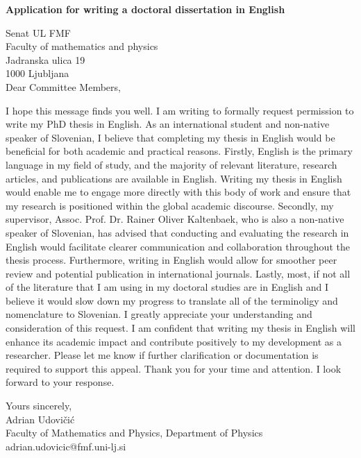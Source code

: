 \documentclass{article}
\theoremstyle{mytheoremstyle}
\theoremstyle{mytheoremstyle}
\theoremstyle{myproblemstyle}
\begin{document}
\clearpage
\pagestyle{plain}

\begin{center}
    \textbf{Application for writing a doctoral dissertation in English}\\
\end{center}

\noindent Senat UL FMF\\
    Faculty of mathematics and physics\\
    Jadranska ulica 19\\
    1000 Ljubljana\\

\vspace{1cm} %
Dear Committee Members,
\vspace{1cm}

I hope this message finds you well. I am writing to formally request permission to write my PhD thesis in English.
As an international student and non-native speaker of Slovenian, I believe that completing my thesis in English would be beneficial for both academic and practical reasons.
Firstly, English is the primary language in my field of study, and the majority of relevant literature, research articles, and publications are available in English.
Writing my thesis in English would enable me to engage more directly with this body of work and ensure that my research is positioned within the global academic discourse.
Secondly, my supervisor, Assoc. Prof. Dr. Rainer Oliver Kaltenbaek, who is also a non-native speaker of Slovenian, has advised that conducting and evaluating the research in
English would facilitate clearer communication and collaboration throughout the thesis process. Furthermore, writing in English would allow for smoother peer review
and potential publication in international journals.
Lastly, most, if not all of the literature that I am using in my doctoral studies are in English and I believe it would slow down my progress to translate
all of the terminoligy and nomenclature to Slovenian.
I greatly appreciate your understanding and consideration of this request. I am confident that writing my thesis in English will enhance its academic
impact and contribute positively to my development as a researcher. Please let me know if further clarification or documentation is required to support this appeal.
Thank you for your time and attention. I look forward to your response.

\vspace{1cm}
Yours sincerely,\\
Adrian Udovičić\\
Faculty of Mathematics and Physics, Department of Physics\\
adrian.udovicic@fmf.uni-lj.si
\end{document}
